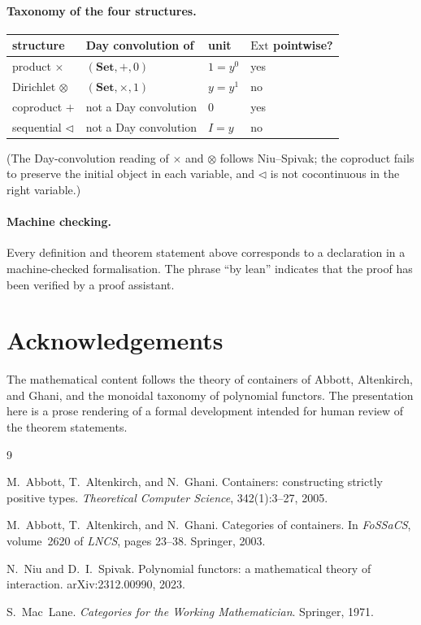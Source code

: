 \documentclass[11pt,a4paper]{article}
\theoremstyle{plain}
\theoremstyle{definition}
\newcommand{\Ext}{\mathrm{Ext}}
\newcommand{\seq}{\mathbin{\triangleleft}}
\begin{document}
\paragraph{Taxonomy of the four structures.}
\begin{center}
\begin{tabular}{llll}
structure & Day convolution of & unit & $\Ext$ pointwise? \\
\hline
product $\times$ & $(\mathbf{Set}, +, 0)$ & $1 = y^0$ & yes \\
Dirichlet $\otimes$ & $(\mathbf{Set}, \times, 1)$ & $y = y^1$ & no \\
coproduct $+$ & not a Day convolution & $0$ & yes \\
sequential $\seq$ & not a Day convolution & $I = y$ & no
\end{tabular}
\end{center}
(The Day-convolution reading of $\times$ and $\otimes$ follows Niu--Spivak;
the coproduct fails to preserve the initial object in each variable, and
$\seq$ is not cocontinuous in the right variable.)

\paragraph{Machine checking.}
Every definition and theorem statement above corresponds to a declaration
in a machine-checked formalisation. The phrase ``by lean'' indicates that
the proof has been verified by a proof assistant.

\section*{Acknowledgements}

The mathematical content follows the theory of containers of Abbott,
Altenkirch, and Ghani, and the monoidal taxonomy of polynomial functors.
The presentation here is a prose rendering of a formal development
intended for human review of the theorem statements.

\begin{thebibliography}{9}

M.~Abbott, T.~Altenkirch, and N.~Ghani.
\newblock Containers: constructing strictly positive types.
\newblock \emph{Theoretical Computer Science}, 342(1):3--27, 2005.

M.~Abbott, T.~Altenkirch, and N.~Ghani.
\newblock Categories of containers.
\newblock In \emph{FoSSaCS}, volume~2620 of \emph{LNCS}, pages 23--38.
\newblock Springer, 2003.

N.~Niu and D.~I.~Spivak.
\newblock Polynomial functors: a mathematical theory of interaction.
\newblock arXiv:2312.00990, 2023.

S.~Mac~Lane.
\newblock \emph{Categories for the Working Mathematician}.
\newblock Springer, 1971.

\end{thebibliography}
\end{document}
